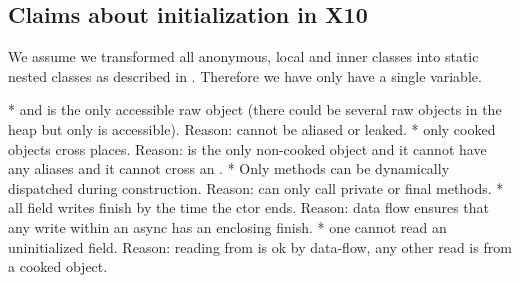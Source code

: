 \subsection{Claims about initialization in X10}
We assume we transformed all anonymous, local and inner classes into static nested classes
    as described in .
Therefore we have only have a single \this variable.


* \this and  is the only accessible raw object (there could be several raw objects in the heap but only \this is accessible). Reason: \this cannot be aliased or leaked.
* only cooked objects cross places. Reason: \this is the only non-cooked object and it cannot have any aliases and it cannot cross an .
* Only  methods can be dynamically dispatched during construction. Reason: can only call private or final methods.
* all field writes finish by the time the ctor ends. Reason: data flow ensures that any write within an async has an enclosing finish.
* one cannot read an uninitialized field. Reason: reading from \this is ok by data-flow, any other read is from a cooked object.

